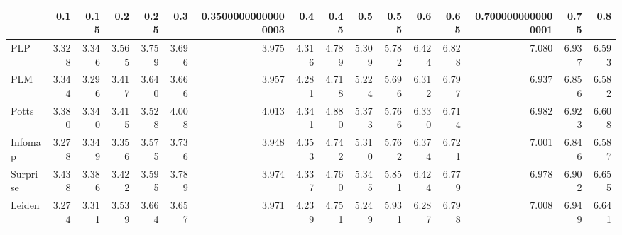 \begin{tabular}{lrrrrrrrrrrrrrrr}
\toprule
{} &   0.1 &  0.15 &   0.2 &  0.25 &   0.3 & 0.35000000000000003 &   0.4 &  0.45 &   0.5 &  0.55 &   0.6 &  0.65 & 0.7000000000000001 &  0.75 &   0.8 \\
\midrule
PLP      & 3.328 & 3.346 & 3.565 & 3.759 & 3.696 &               3.975 & 4.316 & 4.789 & 5.309 & 5.782 & 6.424 & 6.828 &              7.080 & 6.937 & 6.593 \\
PLM      & 3.344 & 3.296 & 3.417 & 3.640 & 3.666 &               3.957 & 4.281 & 4.718 & 5.224 & 5.696 & 6.312 & 6.797 &              6.937 & 6.856 & 6.582 \\
Potts    & 3.380 & 3.340 & 3.415 & 3.528 & 4.008 &               4.013 & 4.341 & 4.880 & 5.373 & 5.766 & 6.330 & 6.714 &              6.982 & 6.923 & 6.608 \\
Infomap  & 3.278 & 3.349 & 3.356 & 3.575 & 3.736 &               3.948 & 4.353 & 4.742 & 5.310 & 5.762 & 6.374 & 6.721 &              7.001 & 6.846 & 6.587 \\
Surprise & 3.438 & 3.386 & 3.422 & 3.595 & 3.789 &               3.974 & 4.337 & 4.760 & 5.345 & 5.851 & 6.424 & 6.779 &              6.978 & 6.902 & 6.655 \\
Leiden   & 3.274 & 3.311 & 3.539 & 3.664 & 3.657 &               3.971 & 4.239 & 4.751 & 5.249 & 5.931 & 6.287 & 6.798 &              7.008 & 6.949 & 6.641 \\
\bottomrule
\end{tabular}
